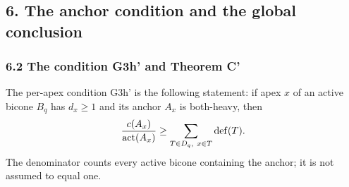 \subsection*{6. The anchor condition and the global conclusion}
\subsubsection*{6.2 The condition G3h' and Theorem C'}
The per-apex condition G3h' is the following statement: if apex $x$ of an active bicone $B_q$ has $d_x\geq1$ and its anchor $A_x$ is both-heavy, then
\[
 \frac{c(A_x)}{\operatorname{act}(A_x)}\geq
       \sum_{T\in D_q,\ x\in T}\operatorname{def}(T).
\]
The denominator counts every active bicone containing the anchor; it is not assumed to equal one.

